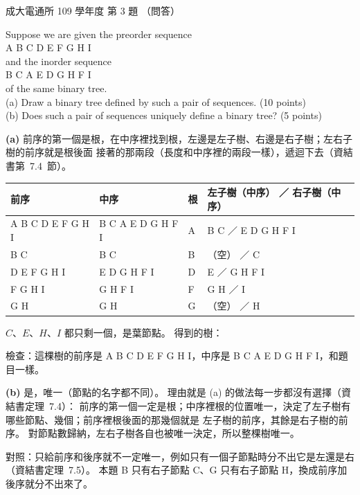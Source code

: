 \begin{pastexam}[label={px:ncku-109-comm-ds-03}]{成大電通所 109 學年度 第 3 題}
（問答）

Suppose we are given the preorder sequence\\
\hspace*{5em}A B C D E F G H I\\
and the inorder sequence\\
\hspace*{5em}B C A E D G H F I\\
of the same binary tree.\\
(a) Draw a binary tree defined by such a pair of sequences. (10 points)\\
(b) Does such a pair of sequences uniquely define a binary tree? (5 points)
\end{pastexam}

\begin{pastsoln}
\textbf{(a)} 前序的第一個是根，在中序裡找到根，左邊是左子樹、右邊是右子樹；左右子樹的前序就是根後面
接著的那兩段（長度和中序裡的兩段一樣），遞迴下去（資結書第~7.4~節）。
\begin{center}
\small
\begin{tabular}{llll}
\toprule
前序 & 中序 & 根 & 左子樹（中序） ／ 右子樹（中序） \\
\midrule
A B C D E F G H I & B C A E D G H F I & A & B C ／ E D G H F I \\
B C & B C & B & （空） ／ C \\
D E F G H I & E D G H F I & D & E ／ G H F I \\
F G H I & G H F I & F & G H ／ I \\
G H & G H & G & （空） ／ H \\
\bottomrule
\end{tabular}
\end{center}
$C$、$E$、$H$、$I$ 都只剩一個，是葉節點。 得到的樹：
\begin{center}
\end{center}
檢查：這棵樹的前序是 A B C D E F G H I，中序是 B C A E D G H F I，和題目一樣。

\textbf{(b)} 是，唯一（節點的名字都不同）。 理由就是 (a) 的做法每一步都沒有選擇（資結書定理~7.4）：
前序的第一個一定是根；中序裡根的位置唯一，決定了左子樹有哪些節點、幾個；前序裡根後面的那幾個就是
左子樹的前序，其餘是右子樹的前序。 對節點數歸納，左右子樹各自也被唯一決定，所以整棵樹唯一。

對照：只給前序和後序就不一定唯一，例如只有一個子節點時分不出它是左還是右（資結書定理~7.5）。 本題
B 只有右子節點 C、G 只有右子節點 H，換成前序加後序就分不出來了。
\end{pastsoln}
